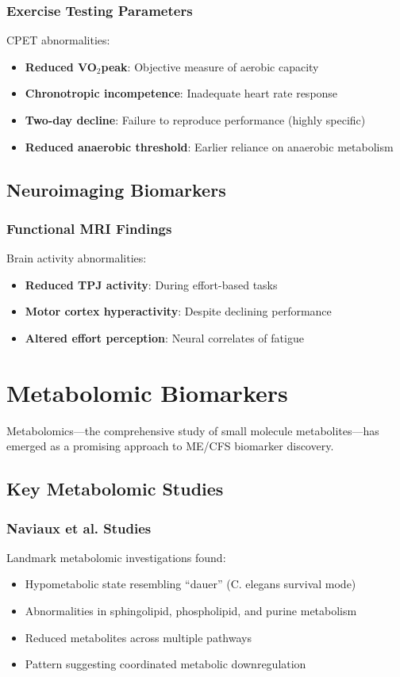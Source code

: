 \subsubsection{Exercise Testing Parameters}
CPET abnormalities:
\begin{itemize}
    \item \textbf{Reduced VO$_2$peak}: Objective measure of aerobic capacity
    \item \textbf{Chronotropic incompetence}: Inadequate heart rate response
    \item \textbf{Two-day decline}: Failure to reproduce performance (highly specific)
    \item \textbf{Reduced anaerobic threshold}: Earlier reliance on anaerobic metabolism
\end{itemize}

\subsection{Neuroimaging Biomarkers}

\subsubsection{Functional MRI Findings}
Brain activity abnormalities:
\begin{itemize}
    \item \textbf{Reduced TPJ activity}: During effort-based tasks
    \item \textbf{Motor cortex hyperactivity}: Despite declining performance
    \item \textbf{Altered effort perception}: Neural correlates of fatigue
\end{itemize}

\section{Metabolomic Biomarkers}
\label{sec:metabolomic}

Metabolomics---the comprehensive study of small molecule metabolites---has emerged as a promising approach to ME/CFS biomarker discovery.

\subsection{Key Metabolomic Studies}

\subsubsection{Naviaux et al. Studies}
Landmark metabolomic investigations found:
\begin{itemize}
    \item Hypometabolic state resembling ``dauer'' (C. elegans survival mode)
    \item Abnormalities in sphingolipid, phospholipid, and purine metabolism
    \item Reduced metabolites across multiple pathways
    \item Pattern suggesting coordinated metabolic downregulation
\end{itemize}

